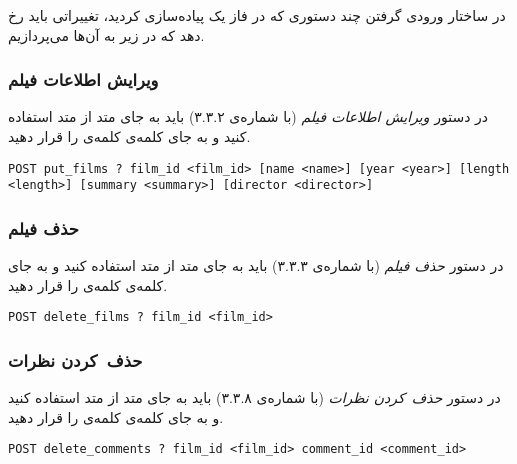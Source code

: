 \documentclass{utap}
\begin{document}
    در ساختار ورودی گرفتن چند دستوری که در فاز یک پیاده‌سازی کردید، تغییراتی باید رخ دهد که در زیر به آن‌ها می‌پردازیم.

    \subsubsection{ویرایش اطلاعات فیلم}

    در دستور \textit{ویرایش اطلاعات فیلم} (با شماره‌ی ۳.۳.۲) باید به‌ جای متد  از متد  استفاده کنید و به‌ جای کلمه‌ی  کلمه‌ی  را قرار دهید.
    \begin{latin}
        \scriptsize
        \begin{Verbatim}[frame=lines,label={\rl{دستور ورودی}}]
POST put_films ? film_id <film_id> [name <name>] [year <year>] [length <length>] [summary <summary>] [director <director>]
        \end{Verbatim}
    \end{latin}

    \subsubsection{حذف فیلم}

    در دستور \textit{حذف فیلم} (با شماره‌ی ۳.۳.۳) باید به جای متد  از متد  استفاده کنید و به جای کلمه‌ی  کلمه‌ی  را قرار دهید.
    \begin{latin}
        \scriptsize
        \begin{Verbatim}[frame=lines,label={\rl{دستور ورودی}}]
POST delete_films ? film_id <film_id>
        \end{Verbatim}
    \end{latin}

    \subsubsection{حذف~کردن نظرات}

    در دستور \textit{حذف~کردن نظرات} (با شماره‌ی ۳.۳.۸) باید به جای متد  از متد  استفاده کنید و به جای کلمه‌ی  کلمه‌ی  را قرار دهید.
    \begin{latin}
        \scriptsize
        \begin{Verbatim}[frame=lines,label={\rl{دستور ورودی}}]
POST delete_comments ? film_id <film_id> comment_id <comment_id>
        \end{Verbatim}
    \end{latin}
\end{document}
